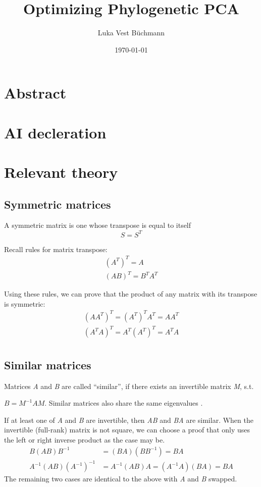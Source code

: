 \documentclass[12pt]{article}
\author{Luka Vest Büchmann}
\title{Optimizing Phylogenetic PCA}
\date{\today}
\theoremstyle{definition}
\begin{document}

\tableofcontents
\newpage

\section{Abstract}


\section{AI decleration}

\section{Relevant theory}

\subsection{Symmetric matrices}

A symmetric matrix is one whose transpose is equal to itself
\[ S = S^T \]

Recall rules for matrix transpose:
\begin{align*}
	(A^T)^T = A \\
	(AB)^T = B^T A^T 
\end{align*}


Using these rules, we can prove that the product of any matrix with its transpose is symmetric:
\begin{align*}
	(A A^T)^T = (A^T)^T A^T = A A^T \\
	(A^T A)^T = A^T (A^T)^T = A^T A \\
\end{align*}

\subsection{Similar matrices}

Matrices \textit{A} and \textit{B} are called ``similar'', if there exists an invertible matrix \textit{M}, s.t.

$B = M^{-1} A M$. Similar matrices also share the same eigenvalues .

If at least one of \textit{A} and \textit{B} are invertible, then \textit{AB} and \textit{BA} are similar.
When the invertible (full-rank) matrix is not square, we can choose a proof that only uses the left or right inverse product as the case may be.
\begin{align*}
	B (A B) B^{-1} &= (B A) (B B^{-1}) = B A  \\
	A^{-1} (A B) (A^{-1})^{-1} &= A^{-1} (A B) A = (A^{-1} A) (B A) = B A 
\end{align*}
The remaining two cases are identical to the above with \textit{A} and \textit{B} swapped.
\end{document}
